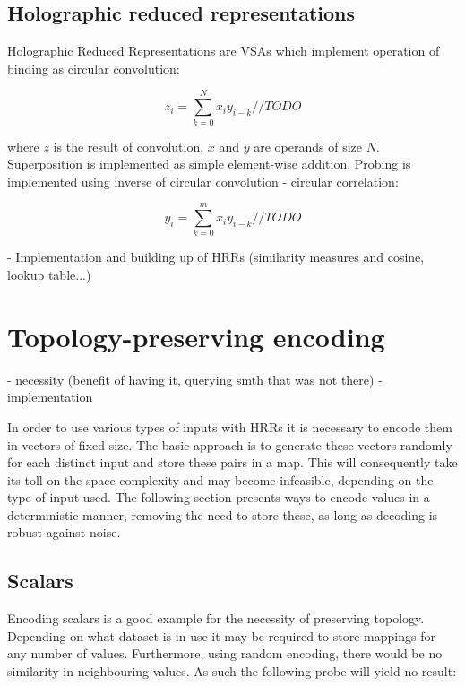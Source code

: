 \documentclass[conference]{IEEEtran}
\begin{document}
	\subsection{Holographic reduced representations}
	\label{sec:hrr}
	
	Holographic Reduced Representations are VSAs which implement operation of binding as circular convolution:
	
	\begin{equation}
	z_i=\sum_{k=0}^{N}{x_iy_{i-k}} //TODO
	\end{equation}
	
	where $z$ is the result of convolution, $x$ and $y$ are operands of size $N$.
Superposition is implemented as simple element-wise addition.
Probing is implemented using inverse of circular convolution - circular correlation:
	
	\begin{equation}
	y_i=\sum_{k=0}^{m}{x_iy_{i-k}} //TODO
	\end{equation} 
	
	- Implementation and building up of HRRs (similarity measures and cosine, lookup table...)
	
	
	\section{Topology-preserving encoding}
	
	- necessity (benefit of having it, querying smth that was not there)
	- implementation
	
	In order to use various types of inputs with HRRs it is necessary to encode them in vectors of fixed size.
The basic approach is to generate these vectors randomly for each distinct input and store these pairs in a map.
This will consequently take its toll on the space complexity and may become infeasible, depending on the type of input used.
The following section presents ways to encode values in a deterministic manner, removing the need to store these, as long as decoding is robust against noise. 
	
	\subsection{Scalars}
	
	Encoding scalars is a good example for the necessity of preserving topology.
Depending on what dataset is in use it may be required to store mappings for any number of values.
Furthermore, using random encoding, there would be no similarity in neighbouring values.
As such the following probe will yield no result:
	
\end{document}
